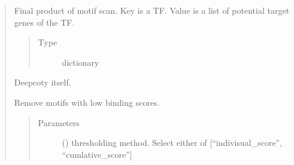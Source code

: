 \documentclass[letterpaper,10pt,english]{sphinxmanual}
\begin{document}
\begin{quote}
\begin{fulllineitems}
\begin{fulllineitems}
\begin{quote}
\begin{description}
\end{description}\end{quote}

\end{fulllineitems}


\begin{fulllineitems}
\label{\detokenize{modules/celloracle.motif_analysis:celloracle.motif_analysis.TFinfo.dic_TF2targetgenes}}
Final product of motif scan. Key is a TF. Value is a list of potential target genes of the TF.
\begin{quote}\begin{description}
\item[{Type}] \leavevmode
dictionary

\end{description}\end{quote}

\end{fulllineitems}


\begin{fulllineitems}
\label{\detokenize{modules/celloracle.motif_analysis:celloracle.motif_analysis.TFinfo.copy}}
Deepcoty itself.

\end{fulllineitems}


\begin{fulllineitems}
\label{\detokenize{modules/celloracle.motif_analysis:celloracle.motif_analysis.TFinfo.filter_motifs_by_score}}
Remove motifs with low binding scores.
\begin{quote}\begin{description}
\item[{Parameters}] \leavevmode
{} () \textendash{} thresholding method. Select either of {[}“indivisual\_score”, “cumlative\_score”{]}


\end{description}
\end{quote}
\end{fulllineitems}
\end{fulllineitems}
\end{quote}
\end{document}
